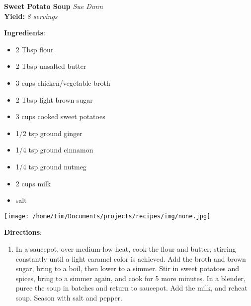 \documentclass[11pt, twoside, openany]{book}
\begin{document}
\noindent\begin{minipage}[t]{\linewidth}%
{\Large\textbf{Sweet Potato Soup}} \label{sweet-potato-soup}\hfill\textit{Sue Dunn}\\
\textbf{Yield:} \textit{8 servings}\\
\noindent\begin{minipage}[t]{0.78\linewidth}%
\textbf{Ingredients}:\vspace{-3mm}
\begin{multicols}{2}
\begin{itemize}\setlength\itemsep{-1mm}
\item 2 Tbsp flour
\item 2 Tbsp unsalted butter
\item 3 cups chicken/vegetable broth
\item 2 Tbsp light brown sugar
\item 3 cups cooked sweet potatoes
\item 1/2 tsp ground ginger
\item 1/4 tsp ground cinnamon
\item 1/4 tsp ground nutmeg
\item 2 cups milk
\item salt
\end{itemize}
\end{multicols}
\end{minipage}
\noindent\begin{minipage}[t]{0.18\linewidth}
\centering \strut\vspace*{-\baselineskip}\newline
\texttt{[image: /home/tim/Documents/projects/recipes/img/none.jpg]}\\
\end{minipage}\vspace{3mm}
\textbf{Directions}:
\vspace{-3mm}\begin{enumerate}\setlength\itemsep{-1mm}
\item In a saucepot, over medium-low heat, cook the flour and butter, stirring constantly until a light caramel color is achieved. Add the broth and brown sugar, bring to a boil, then lower to a simmer. Stir in sweet potatoes and spices, bring to a simmer again, and cook for 5 more minutes. In a blender, puree the soup in batches and return to saucepot. Add the milk, and reheat soup. Season with salt and pepper.
\end{enumerate}
\end{minipage}\vspace{8mm}
\end{document}
